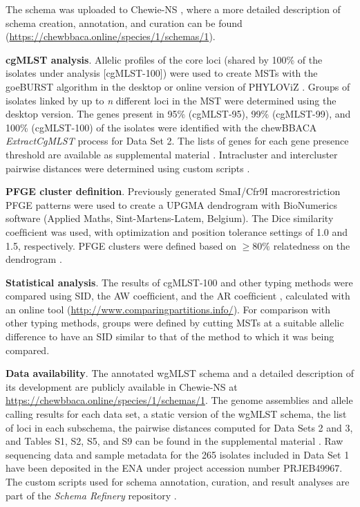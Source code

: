 The schema was uploaded to \ac{Chewie-NS} \cite{mamede_chewie_2021}, where a more detailed description of schema creation, annotation, and curation can be found (\url{https://chewbbaca.online/species/1/schemas/1}).

\textbf{cgMLST analysis}. Allelic proﬁles of the core loci (shared by 100\% of the isolates under analysis [cgMLST-100]) were used to create \ac{MST}s with the goeBURST algorithm in the desktop or online version of PHYLOViZ \cite{nascimento_phyloviz_2017, ribeiro-goncalves_phyloviz_2016}. Groups of isolates linked by up to \textit{n} different loci in the \ac{MST} were determined using the desktop version. The genes present in 95\% (cgMLST-95), 99\% (cgMLST-99), and 100\% (cgMLST-100) of the isolates were identiﬁed with the chewBBACA \textit{ExtractCgMLST} process for Data Set 2. The lists of genes for each gene presence threshold are available as supplemental material \cite{friaes_supplemental_2023}. Intracluster and intercluster pairwise distances were determined using custom scripts \cite{noauthor_release_nodate-4}.

\textbf{PFGE cluster deﬁnition}. Previously generated SmaI/Cfr9I macrorestriction \ac{PFGE} patterns \cite{friaes_superantigen_2013, friaes_group_2012, blackwell_exploring_2021, noauthor_emstreptococcus_nodate} were used to create a \ac{UPGMA} dendrogram with BioNumerics software (Applied Maths, Sint-Martens-Latem, Belgium). The Dice similarity coefﬁcient was used, with optimization and position tolerance settings of 1.0 and 1.5, respectively. \ac{PFGE} clusters were deﬁned based on $\geq80\%$ relatedness on the dendrogram \cite{carrico_illustration_2006}.

\textbf{Statistical analysis}. The results of cgMLST-100 and other typing methods were compared using \ac{SID}, the \ac{AW} coefﬁcient, and the \ac{AR} coefﬁcient \cite{carrico_illustration_2006, severiano_adjusted_2011}, calculated with an online tool (\url{http://www.comparingpartitions.info/}). For comparison with other typing methods, groups were deﬁned by cutting \ac{MST}s at a suitable allelic difference to have an \ac{SID} similar to that of the method to which it was being compared.

\textbf{Data availability}. The annotated \ac{wgMLST} schema and a detailed description of its development are publicly available in \ac{Chewie-NS} \cite{mamede_chewie_2021} at \url{https://chewbbaca.online/species/1/schemas/1}. The genome assemblies and allele calling results for each data set, a static version of the \ac{wgMLST} schema, the list of loci in each subschema, the pairwise distances computed for Data Sets 2 and 3, and Tables S1, S2, S5, and S9 can be found in the supplemental material \cite{friaes_supplemental_2023}. Raw sequencing data and sample metadata for the 265 isolates included in Data Set 1 have been deposited in the \ac{ENA} under project accession number PRJEB49967. The custom scripts used for schema annotation, curation, and result analyses are part of the \textit{Schema Reﬁnery} repository \cite{noauthor_release_nodate-4}.

